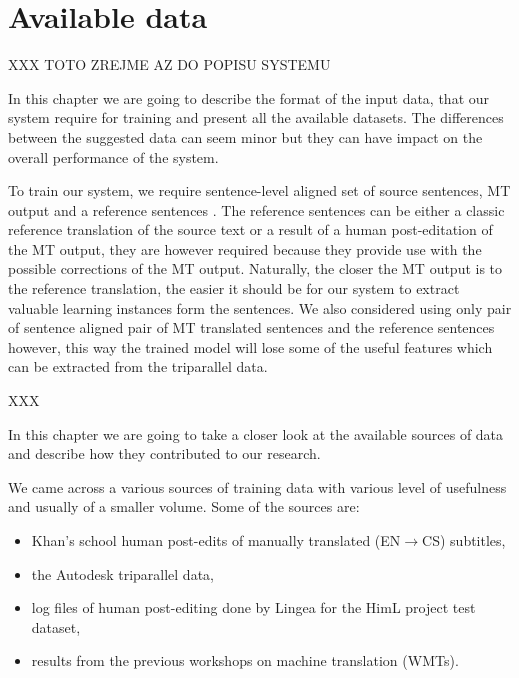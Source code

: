 \chapter{Available data}


XXX TOTO ZREJME AZ DO POPISU SYSTEMU

In this chapter we are going to describe the format of the input data, that
our system require for training and present all the available datasets.
The differences between the suggested data can seem minor but they can
have impact on the overall performance of the system.

To train our system, we require sentence-level aligned set of source sentences,
MT output and a reference sentences
. The reference sentences can be either
a classic reference translation of the source text or a result of a human
post-editation of the MT output, they are however required because they
provide use with the possible corrections of the MT output.
Naturally, the closer the MT output is
to the reference translation, the easier it should be for our system
to extract valuable learning instances form the sentences. We also
considered using only pair of sentence aligned pair of MT translated
sentences and the reference sentences however, this way the trained
model will lose some of the useful features which can be extracted from
the triparallel data.

XXX

In this chapter we are going to take a closer look at the available
sources of data and describe how they contributed to our research.

We came across a various sources of training data with various level
of usefulness and usually of a smaller volume. Some of the sources
are:
\begin{itemize}
\item Khan's school human
post-edits of manually translated (EN$\rightarrow$CS) subtitles,
\item the Autodesk
triparallel data,
\item log files of human post-editing done by Lingea for the
HimL project test dataset,


\item results from the previous workshops on machine translation (WMTs).
\end{itemize}

